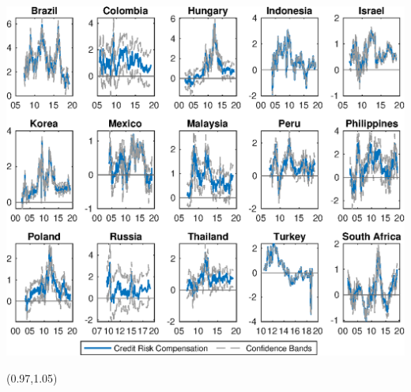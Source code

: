 \documentclass[12pt, aspectratio=169, xcolor=dvipsnames]{beamer}
\begin{document}
\begin{frame}[label=crcCI]
\begin{center}							%
\includegraphics[trim={0cm 0cm 0cm 0cm},clip,height=0.95\textheight,width=\linewidth]{../Figures/Estimation/bsl_cr_CI_10y_V1.eps} \\
\end{center}
\begin{textblock*}{5cm}(0.97\textwidth,1.05\textheight)
\hyperlink{YldDcmp}{}
\end{textblock*}
\end{frame}
\end{document}
